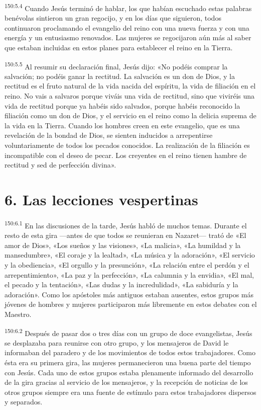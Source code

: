\par 
\textsuperscript{150:5.4} Cuando Jesús terminó de hablar, los que habían escuchado estas palabras benévolas sintieron un gran regocijo, y en los días que siguieron, todos continuaron proclamando el evangelio del reino con una nueva fuerza y con una energía y un entusiasmo renovados. Las mujeres se regocijaron aún más al saber que estaban incluidas en estos planes para establecer el reino en la Tierra.

\par 
\textsuperscript{150:5.5} Al resumir su declaración final, Jesús dijo: «No podéis comprar la salvación; no podéis ganar la rectitud. La salvación es un don de Dios, y la rectitud es el fruto natural de la vida nacida del espíritu, la vida de filiación en el reino. No vais a salvaros porque viváis una vida de rectitud, sino que viviréis una vida de rectitud porque ya habéis sido salvados, porque habéis reconocido la filiación como un don de Dios, y el servicio en el reino como la delicia suprema de la vida en la Tierra. Cuando los hombres creen en este evangelio, que es una revelación de la bondad de Dios, se sienten inducidos a arrepentirse voluntariamente de todos los pecados conocidos. La realización de la filiación es incompatible con el deseo de pecar. Los creyentes en el reino tienen hambre de rectitud y sed de perfección divina».

\section*{6. Las lecciones vespertinas}
\par 
\textsuperscript{150:6.1} En las discusiones de la tarde, Jesús habló de muchos temas. Durante el resto de esta gira ---antes de que todos se reunieran en Nazaret--- trató de «El amor de Dios», «Los sueños y las visiones», «La malicia», «La humildad y la mansedumbre», «El coraje y la lealtad», «La música y la adoración», «El servicio y la obediencia», «El orgullo y la presunción», «La relación entre el perdón y el arrepentimiento», «La paz y la perfección», «La calumnia y la envidia», «El mal, el pecado y la tentación», «Las dudas y la incredulidad», «La sabiduría y la adoración». Como los apóstoles más antiguos estaban ausentes, estos grupos más jóvenes de hombres y mujeres participaron más libremente en estos debates con el Maestro.

\par 
\textsuperscript{150:6.2} Después de pasar dos o tres días con un grupo de doce evangelistas, Jesús se desplazaba para reunirse con otro grupo, y los mensajeros de David le informaban del paradero y de los movimientos de todos estos trabajadores. Como ésta era su primera gira, las mujeres permanecieron una buena parte del tiempo con Jesús. Cada uno de estos grupos estaba plenamente informado del desarrollo de la gira gracias al servicio de los mensajeros, y la recepción de noticias de los otros grupos siempre era una fuente de estímulo para estos trabajadores dispersos y separados.

